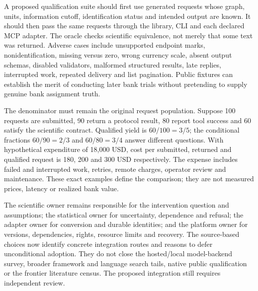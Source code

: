 A proposed qualification suite should first use generated requests whose
graph, units, information cutoff, identification status and intended output
are known. It should then pass the same requests through the library, CLI
and each declared MCP adapter. The oracle checks scientific equivalence,
not merely that some text was returned. Adverse cases include unsupported
endpoint marks, nonidentification, missing versus zero, wrong currency scale,
absent output schemas, disabled validators, malformed structured results,
late replies, interrupted work, repeated delivery and list pagination.
Public fixtures can establish the merit of conducting later bank trials
without pretending to supply genuine bank assignment truth.
\citep{exec24_mcp_contracts}

The denominator must remain the original request population. Suppose 100
requests are submitted, 90 return a protocol result, 80 report tool success
and 60 satisfy the scientific contract. Qualified yield is $60/100=3/5$;
the conditional fractions $60/90=2/3$ and $60/80=3/4$ answer different
questions. With hypothetical expenditure of 18,000 USD, cost per submitted,
returned and qualified request is 180, 200 and 300 USD respectively. The
expense includes failed and interrupted work, retries, remote charges,
operator review and maintenance. These exact examples define the comparison;
they are not measured prices, latency or realized bank value.
\citep{exec24_mcp_contracts}

The scientific owner remains responsible for the intervention question and
assumptions; the statistical owner for uncertainty, dependence and refusal;
the adapter owner for conversion and durable identities; and the platform
owner for versions, dependencies, rights, resource limits and recovery.
The source-based choices now identify concrete integration routes and
reasons to defer unconditional adoption. They do not close the hosted/local
model-backend survey, broader framework and language search tails, native
public qualification or the frontier literature census. The proposed integration still requires independent review.
\citep{exec24_mcp_contracts}
